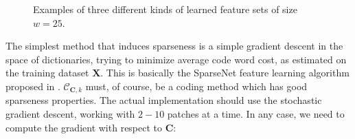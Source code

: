 \documentclass[12pt,a4paper,oneside,english]{UPBThesis}
\begin{document}
\begin{figure}
\centering
{}
\caption{Examples of three different kinds of learned feature sets of size $w=25$.}
\label{fig:ObtainingSetLearn}
\end{figure}

The simplest method that induces sparseness is a simple gradient descent in the space of dictionaries, trying to minimize average code word cost, as estimated on the training dataset $\textbf{X}$. This is basically the SparseNet feature learning algorithm proposed in \cite{emergence-sparse-coding}. $\mathcal{C}_{\textbf{C},k}$ must, of course, be a coding method which has good sparseness properties. The actual implementation should use the stochastic gradient descent, working with $2-10$ patches at a time. In any case, we need to compute the gradient with respect to $\textbf{C}$:
\end{document}
